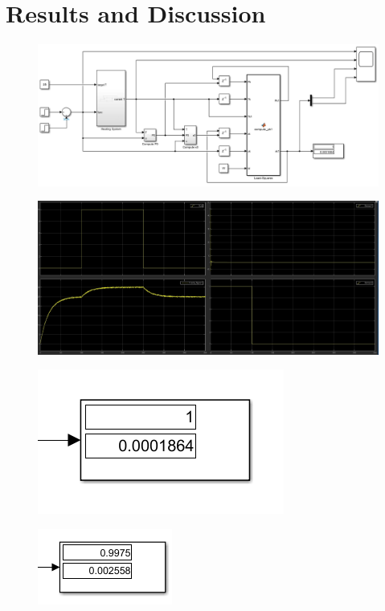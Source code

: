 \section{Results and Discussion}



\begin{figure}[H]
    \centering
    \includegraphics[width=1\linewidth]{figures/simulink_system.png}
    \caption{}
    \label{fig:simulink_system}
\end{figure}



\begin{figure}[H]
    \centering
    \includegraphics[width=1\linewidth]{figures/simulink_plot.png}
    \caption{}
    \label{fig:simulink_plot}
\end{figure}



\begin{figure}[H]
    \centering
    \includegraphics[width=0.7\linewidth]{figures/simulink_params.png}
    \caption{}
    \label{fig:simulink_params}
\end{figure}



\begin{figure}[H]
    \centering
    \includegraphics[width=0.5\linewidth]{figures/simulink_params_gen.png}
    \caption{}
    \label{fig:simulink_params_gen}
\end{figure}


